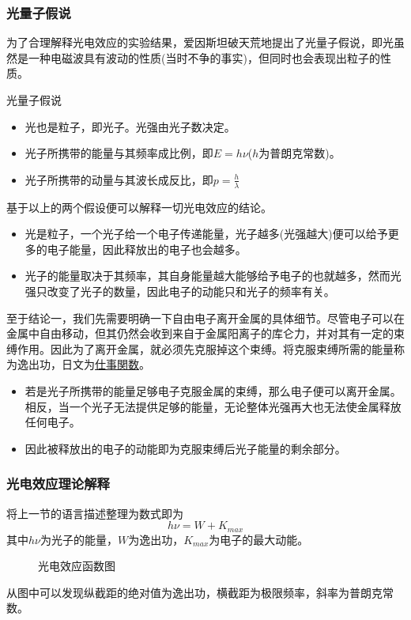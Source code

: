 \subsubsection{光量子假说}

为了合理解释光电效应的实验结果，爱因斯坦破天荒地提出了光量子假说，即光虽然是一种电磁波具有波动的性质(当时不争的事实)，但同时也会表现出粒子的性质。
\begin{itembox}[l]{光量子假说}
    \begin{itemize}
        \item 光也是粒子，即光子。光强由光子数决定。
        \item 光子所携带的能量与其频率成比例，即$E=h\nu$($h$为普朗克常数)。
        \item 光子所携带的动量与其波长成反比，即$p=\frac{h}{\lambda}$
    \end{itemize}
\end{itembox}
基于以上的两个假设便可以解释一切光电效应的结论。
\begin{itemize}
    \item 光是粒子，一个光子给一个电子传递能量，光子越多(光强越大)便可以给予更多的电子能量，因此释放出的电子也会越多。
    \item 光子的能量取决于其频率，其自身能量越大能够给予电子的也就越多，然而光强只改变了光子的数量，因此电子的动能只和光子的频率有关。
\end{itemize}
至于结论一，我们先需要明确一下自由电子离开金属的具体细节。尽管电子可以在金属中自由移动，但其仍然会收到来自于金属阳离子的库仑力，并对其有一定的束缚作用。因此为了离开金属，就必须先克服掉这个束缚。将克服束缚所需的能量称为逸出功，日文为\underline{仕事関数}。
\begin{itemize}
    \item 若是光子所携带的能量足够电子克服金属的束缚，那么电子便可以离开金属。相反，当一个光子无法提供足够的能量，无论整体光强再大也无法使金属释放任何电子。
    \item 因此被释放出的电子的动能即为克服束缚后光子能量的剩余部分。
\end{itemize}

\subsubsection{光电效应理论解释}

将上一节的语言描述整理为数式即为
\begin{equation*}
    h\nu=W+K_{max}
\end{equation*}
其中$h\nu$为光子的能量，$W$为逸出功，$K_{max}$为电子的最大动能。
\begin{figure}[ht!]
    \centering
    \caption{光电效应函数图}
\end{figure}
从图中可以发现纵截距的绝对值为逸出功，横截距为极限频率，斜率为普朗克常数。

